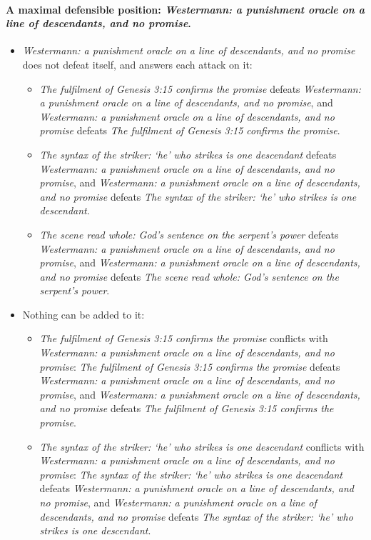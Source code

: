 \documentclass[11pt]{article}
\begin{document}
\paragraph{A maximal defensible position: \emph{Westermann: a punishment oracle on a line of descendants, and no promise}.}
\begin{itemize}
\item \emph{Westermann: a punishment oracle on a line of descendants, and no promise} does not defeat itself, and answers each attack on it:
\begin{itemize}
\item \emph{The fulfilment of Genesis 3:15 confirms the promise} defeats \emph{Westermann: a punishment oracle on a line of descendants, and no promise}, and \emph{Westermann: a punishment oracle on a line of descendants, and no promise} defeats \emph{The fulfilment of Genesis 3:15 confirms the promise}.
\item \emph{The syntax of the striker: ‘he’ who strikes is one descendant} defeats \emph{Westermann: a punishment oracle on a line of descendants, and no promise}, and \emph{Westermann: a punishment oracle on a line of descendants, and no promise} defeats \emph{The syntax of the striker: ‘he’ who strikes is one descendant}.
\item \emph{The scene read whole: God’s sentence on the serpent’s power} defeats \emph{Westermann: a punishment oracle on a line of descendants, and no promise}, and \emph{Westermann: a punishment oracle on a line of descendants, and no promise} defeats \emph{The scene read whole: God’s sentence on the serpent’s power}.
\end{itemize}
\item Nothing can be added to it:
\begin{itemize}
\item \emph{The fulfilment of Genesis 3:15 confirms the promise} conflicts with \emph{Westermann: a punishment oracle on a line of descendants, and no promise}: \emph{The fulfilment of Genesis 3:15 confirms the promise} defeats \emph{Westermann: a punishment oracle on a line of descendants, and no promise}, and \emph{Westermann: a punishment oracle on a line of descendants, and no promise} defeats \emph{The fulfilment of Genesis 3:15 confirms the promise}.
\item \emph{The syntax of the striker: ‘he’ who strikes is one descendant} conflicts with \emph{Westermann: a punishment oracle on a line of descendants, and no promise}: \emph{The syntax of the striker: ‘he’ who strikes is one descendant} defeats \emph{Westermann: a punishment oracle on a line of descendants, and no promise}, and \emph{Westermann: a punishment oracle on a line of descendants, and no promise} defeats \emph{The syntax of the striker: ‘he’ who strikes is one descendant}.

\end{itemize}
\end{itemize}
\end{document}
